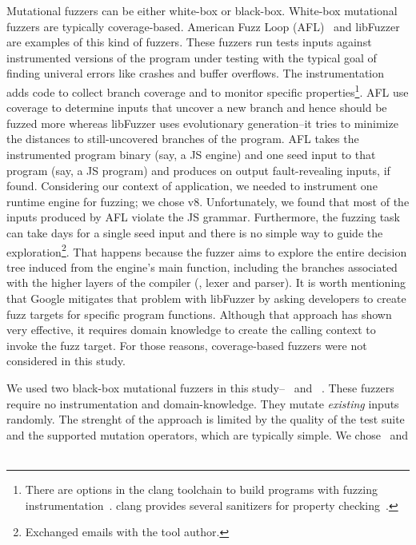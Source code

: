 \documentclass[10pt,conference,anonymous]{IEEEtran}
\begin{document}

Mutational fuzzers can be either white-box or black-box. White-box
mutational fuzzers are typically coverage-based. American Fuzz Loop
(AFL)~\cite{afl} and libFuzzer~\cite{libfuzzer} are examples of this
kind of fuzzers. These fuzzers run tests inputs against instrumented
versions of the program under testing with the typical goal of finding
univeral errors like crashes and buffer overflows. The instrumentation
adds code to collect branch coverage and to monitor specific
properties\footnote{There are options in the clang toolchain to build
  programs with fuzzing instrumentation~\cite{libfuzzer}. clang
  provides several sanitizers for property
  checking~\cite{clang-documentation}.}. AFL use coverage to determine
inputs that uncover a new branch and hence should be fuzzed more
whereas libFuzzer uses evolutionary generation--it tries to minimize
the distances to still-uncovered branches of the program. AFL takes
the instrumented program binary (say, a JS engine) and one seed input
to that program (say, a JS program) and produces on output
fault-revealing inputs, if found. Considering our context of
application, we needed to instrument one runtime engine for fuzzing;
we chose v8. Unfortunately, we found that most of the inputs produced
by AFL violate the JS grammar. Furthermore, the fuzzing task can take
days for a single seed input and there is no simple way to guide the
exploration\footnote{Exchanged emails with the tool author.}. That
happens because the fuzzer aims to explore the entire decision tree
induced from the engine's main function, including the branches
associated with the higher layers of the compiler (\eg{}, lexer and
parser). It is worth mentioning that Google mitigates that problem
with libFuzzer by asking developers to create fuzz targets for
specific program
functions\cite{libFuzzer-tutorial-google,libFuzzer-chromium-google}. Although
that approach has shown very effective, it requires domain knowledge
to create the calling context to invoke the fuzz target. For those
reasons, coverage-based fuzzers were not considered in this study.

We used two black-box mutational fuzzers in this
study--\radamsa~\cite{radamsa} and \quickfuzz~\cite{quickfuzz}. These
fuzzers require no instrumentation and domain-knowledge. They mutate
\emph{existing} inputs randomly. The strenght of the approach is
limited by the quality of the test suite and the supported mutation
operators, which are typically simple. We chose \radamsa\ and
\quickfuzz\  
\end{document}
